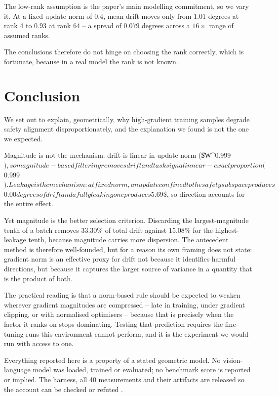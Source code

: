 \documentclass[10pt,twocolumn,letterpaper]{article}
\begin{document}
The low-rank assumption is the paper's main modelling commitment, so we vary it. At a fixed update norm of $0.4$, mean drift moves only from $1.01$ degrees at rank $4$ to $0.93$ at rank $64$ -- a spread of $0.079$ degrees across a $16\times$ range of assumed ranks.

The conclusions therefore do not hinge on choosing the rank correctly, which is fortunate, because in a real model the rank is not known.




\section{Conclusion}


We set out to explain, geometrically, why high-gradient training samples degrade safety alignment disproportionately, and the explanation we found is not the one we expected.

Magnitude is not the mechanism: drift is linear in update norm (\$\|\Delta W\|^{0.999}$), so magnitude-based filtering removes drift and task signal in near-exact proportion ($0.999\times$). Leakage is the mechanism: at fixed norm, an update confined to the safety subspace produces $0.00$ degrees of drift and a fully leaking one produces $5.69\$, so direction accounts for the entire effect.

Yet magnitude is the better selection criterion. Discarding the largest-magnitude tenth of a batch removes $33.30\%$ of total drift against $15.08\%$ for the highest-leakage tenth, because magnitude carries more dispersion. The antecedent method is therefore well-founded, but for a reason its own framing does not state: gradient norm is an effective proxy for drift not because it identifies harmful directions, but because it captures the larger source of variance in a quantity that is the product of both.

The practical reading is that a norm-based rule should be expected to weaken wherever gradient magnitudes are compressed -- late in training, under gradient clipping, or with normalised optimisers -- because that is precisely when the factor it ranks on stops dominating. Testing that prediction requires the fine-tuning runs this environment cannot perform, and it is the experiment we would run with access to one.

Everything reported here is a property of a stated geometric model. No vision-language model was loaded, trained or evaluated; no benchmark score is reported or implied. The harness, all 40 measurements and their artifacts are released so the account can be checked or refuted \cite{arxiv_2604_17215}.
\end{document}
